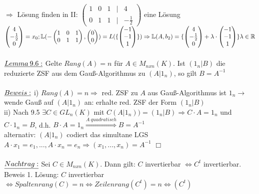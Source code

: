 \documentclass[fleqn, a4paper, 11pt]{scrartcl}
\newcommand{\RR}{\mathbb{R}}
\theoremstyle{definition}
\begin{document}
$\Rightarrow$ Lösung finden in II: $\begin{pmatrix}
	1 & 0 & 1 & | & 4 \\
	0 & 1 & 1 & | & -\tfrac{1}{2}
\end{pmatrix}$ eine Lösung $\begin{pmatrix}
	4\\
	-\tfrac{1}{2}\\
	0
\end{pmatrix}=x_0;\mathbb{L}(-\begin{pmatrix}
	1 & 0 & 1\\
	0 & 1 & 1
\end{pmatrix},\begin{pmatrix}
	0\\
	0
\end{pmatrix})=L(\{\begin{pmatrix}
	-1 \\
	-1\\
	1
\end{pmatrix}\})\\
\Rightarrow\mathbb{L}(A,b_2)=\{\begin{pmatrix}
	4\\
	-\tfrac{1}{2}\\
	0
\end{pmatrix}+\lambda\cdot\begin{pmatrix}
	-1\\
	-1\\
	1
\end{pmatrix}\} \lambda\in\RR$\\
\\
$\uline{Lemma\:9.6:}$ Gelte $Rang(A)=n$ für $A\in M_{nxn}(K)$. Ist $(1_n|B)$ die reduzierte ZSF aus dem Gauß-Algorithmus zu $(A|1_n)$, so gilt $B=A^{-1}$\\
\\
$\uline{Beweis:}$ i) $Rang(A)=n\Rightarrow$ red. ZSF zu $A$ aus Gauß-Algorithmus ist $1_n\rightarrow$ wende Gauß auf $(A|1_n)$ an: erhalte red. ZSF der Form $(1_n|B)$\\
ii) Nach 9.5 $\exists C\in GL_n(K)$ mit $C(A|1_n))=(1_n|B)\Rightarrow C\cdot A=1_n$ und $C\cdot 1_n=B$, d.h. $B\cdot A=1_n\stackrel{A\:quadratisch}{\Rightarrow}B=A^{-1}$\\
alternativ: $(A|1_n)$ codiert das simultane LGS $A\cdot x_1=e_1,...,A\cdot x_n=e_n\Rightarrow(x_1,...,x_n)=A^{-1}$ \hfill $\Box$\\
\\
$\uline{Nachtrag:}$ Sei $C\in M_{nxn}(K)$. Dann gilt: $C$ invertierbar $\Leftrightarrow C^t$ invertierbar. Beweis 1. Lösung: $C$ invertierbar $\Leftrightarrow Spaltenrang(C)=n\Leftrightarrow Zeilenrang(C^t)=n\Leftrightarrow (C^t)$\\
\end{document}
